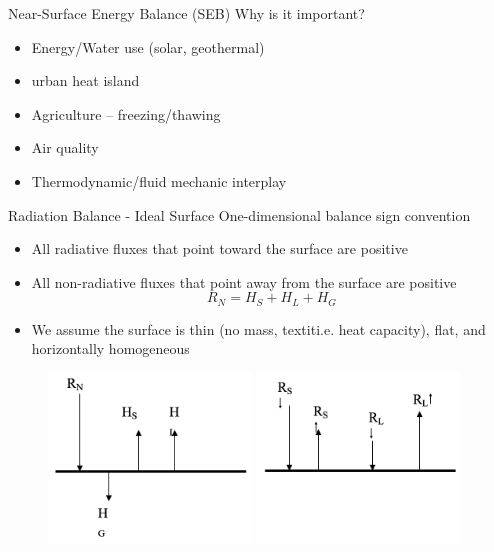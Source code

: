 \begin{frame}{Near-Surface Energy Balance (SEB)}
Why is it important?
\begin{itemize}
	\item Energy/Water use (solar, geothermal)
	\item urban heat island
	\item Agriculture – freezing/thawing
	\item Air quality
	\item Thermodynamic/fluid mechanic interplay
\end{itemize}
\end{frame}

\begin{frame}{Radiation Balance - Ideal Surface}
One-dimensional balance sign convention
\begin{itemize}
	\item All radiative fluxes that point toward the surface are positive
	\item All non-radiative fluxes that point away from the surface are positive
	$$R_N = H_S + H_L + H_G$$
	\item We assume the surface is thin (no mass, textit{i.e.} heat capacity), flat, and horizontally homogeneous
\end{itemize}
\begin{figure}
	\includegraphics[width=0.48\textwidth]{rad3.png}
	\includegraphics[width=0.48\textwidth]{rad4.png}
\end{figure}
\end{frame}

